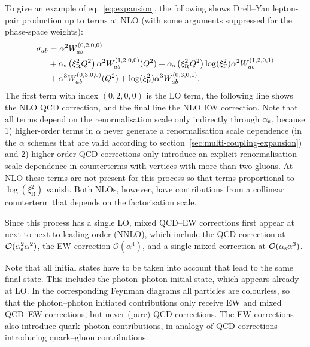 To give an example of eq.~\eqref{eq:expansion}, the following shows Drell--Yan lepton-pair production up to terms at NLO (with some arguments suppressed for the phase-space weights):
\begin{equation}
\begin{split}
\sigma_{ab}
    &= \alpha^2 W_{ab}^{(0,2,0,0)} \\
    &+ \alpha_\mathrm{s} \left( \xi_\mathrm{R}^2 Q^2 \right) \alpha^2 W_{ab}^{(1,2,0,0)} (Q^2) + \alpha_\mathrm{s} \left( \xi_\mathrm{R}^2 Q^2 \right) \log (\xi_\mathrm{F}^2) \alpha^2 W_{ab}^{(1,2,0,1)} \\
    &+ \alpha^3 W_{ab}^{(0,3,0,0)} (Q^2) + \log (\xi_\mathrm{F}^2) \alpha^3 W_{ab}^{(0,3,0,1)} \text{.}
\end{split}
\end{equation}
The first term with index $(0,2,0,0)$ is the LO term, the following line shows the NLO QCD correction, and the final line the NLO EW correction.
Note that all terms depend on the renormalisation scale only indirectly through $\alpha_\mathrm{s}$, because 1) higher-order terms in $\alpha$ never generate a renormalisation scale dependence (in the $\alpha$ schemes that are valid according to section~\ref{sec:multi-coupling-expansion}) and 2) higher-order QCD corrections only introduce an explicit renormalisation scale dependence in counterterms with vertices with more than two gluons.
At NLO these terms are not present for this process so that terms proportional to $\log (\xi_\mathrm{R}^2)$ vanish.
Both NLOs, however, have contributions from a collinear counterterm that depends on the factorisation scale.

Since this process has a single LO, mixed QCD--EW corrections first appear at next-to-next-to-leading order (NNLO), which include the QCD correction at $\mathcal{O} (\alpha_\mathrm{s}^2 \alpha^2)$, the EW correction $\mathcal{O} (\alpha^4)$, and a single mixed correction at $\mathcal{O} (\alpha_\mathrm{s} \alpha^3)$.

Note that all initial states have to be taken into account that lead to the same final state.
This includes the photon--photon initial state, which appears already at LO.
In the corresponding Feynman diagrams all particles are colourless, so that the photon--photon initiated contributions only receive EW and mixed QCD--EW corrections, but never (pure) QCD corrections.
The EW corrections also introduce quark--photon contributions, in analogy of QCD corrections introducing quark--gluon contributions.

